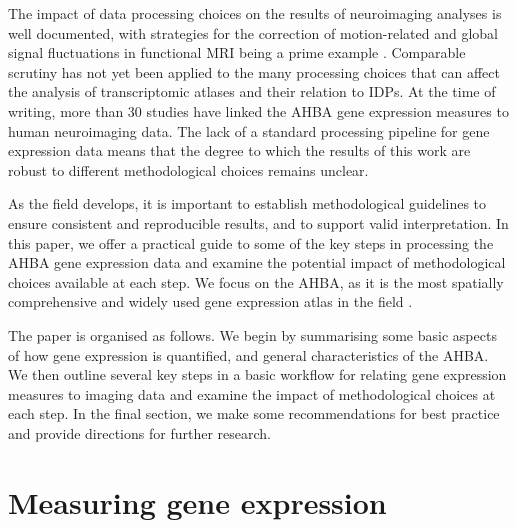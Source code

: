 The impact of data processing choices on the results of neuroimaging analyses is well documented, with strategies for the correction of motion-related and global signal fluctuations in functional MRI being a prime example \citep{Power2015a,Power2017,Ciric2017,Parkes2018}. Comparable scrutiny has not yet been applied to the many processing choices that can affect the analysis of transcriptomic atlases and their relation to IDPs. At the time of writing, more than 30 studies have linked the AHBA gene expression measures to human neuroimaging data. The lack of a standard processing pipeline for gene expression data means that the degree to which the results of this work are robust to different methodological choices remains unclear.

As the field develops, it is important to establish methodological guidelines to ensure consistent and reproducible results, and to support valid interpretation. In this paper, we offer a practical guide to some of the key steps in processing the AHBA gene expression data and examine the potential impact of methodological choices available at each step. We focus on the AHBA, as it is the most spatially comprehensive and widely used gene expression atlas in the field \citep{Hawrylycz2012}.

The paper is organised as follows. We begin by summarising some basic aspects of how gene expression is quantified, and general characteristics of the AHBA. We then outline several key steps in a basic workflow for relating gene expression measures to imaging data and examine the impact of methodological choices at each step. In the final section, we make some recommendations for best practice and provide directions for further research.


\section{Measuring gene expression}

